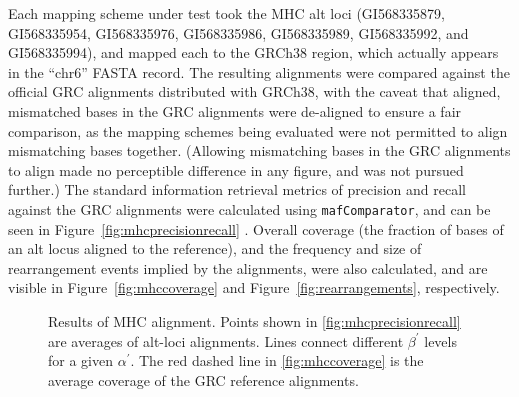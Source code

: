 Each mapping scheme under test took the MHC alt loci (GI568335879, GI568335954, GI568335976, GI568335986, GI568335989, GI568335992, and GI568335994), and mapped each to the GRCh38  region, which actually appears in the ``chr6'' FASTA record. The resulting alignments were compared against the official GRC alignments distributed with GRCh38, with the caveat that aligned, mismatched bases in the GRC alignments were de-aligned to ensure a fair comparison, as the mapping schemes being evaluated were not permitted to align mismatching bases together. (Allowing mismatching bases in the GRC alignments to align made no perceptible difference in any figure, and was not pursued further.) The standard information retrieval metrics of precision and recall against the GRC alignments were calculated using \texttt{mafComparator}, and can be seen in Figure~\ref{fig:mhcprecisionrecall} \citep{earl2014alignathon}. Overall coverage (the fraction of bases of an alt locus aligned to the reference), and the frequency and size of rearrangement events implied by the alignments, were also calculated, and are visible in Figure~\ref{fig:mhccoverage} and Figure~\ref{fig:rearrangements}, respectively.


\begin{figure}[t]
  \centering
  \caption[Results of MHC alignment]{Results of MHC alignment. Points shown in \ref{fig:mhcprecisionrecall} are averages of alt-loci alignments. Lines connect different $\beta^\prime$ levels for a given $\alpha^\prime$. The red dashed line in \ref{fig:mhccoverage} is the average coverage of the GRC reference alignments.}
  \label{fig:mhc}
\end{figure}


